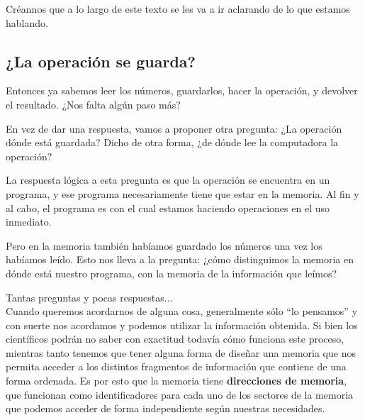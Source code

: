 \documentclass[a4paper, titlepage]{report}
\begin{document}
	Créannos que a lo largo de este texto se les va a ir aclarando de lo que estamos hablando.
	
	\subsection{¿La operación se guarda?}
	
	Entonces ya sabemos leer los números, guardarlos, hacer la operación, y devolver el resultado. ¿Nos falta algún paso más?
	
	En vez de dar una respuesta, vamos a proponer otra pregunta: ¿La operación dónde está guardada? Dicho de otra forma, ¿de dónde lee la computadora la operación?
	
	La respuesta lógica a esta pregunta es que la operación se encuentra en un programa, y ese programa necesariamente tiene que estar en la memoria. Al fin y al cabo, el programa es con el cual estamos haciendo operaciones en el uso inmediato.
	
	Pero en la memoria también habíamos guardado los números una vez los habíamos leído. Esto nos lleva a la pregunta: ¿cómo distinguimos la memoria en dónde está nuestro programa, con la memoria de la información que leímos?
	
	Tantas preguntas y pocas respuestas...\\
	
	Cuando queremos acordarnos de alguna cosa, generalmente sólo ``lo pensamos'' y con suerte nos acordamos y podemos utilizar la información obtenida. Si bien los científicos podrán no saber con exactitud todavía cómo funciona este proceso, mientras tanto tenemos que tener alguna forma de diseñar una memoria que nos permita acceder a los distintos fragmentos de información que contiene de una forma ordenada. Es por esto que la memoria tiene \textbf{direcciones de memoria}, que funcionan como identificadores para cada uno de los sectores de la memoria que podemos acceder de forma independiente según nuestras necesidades. 
	
	
	
	
	
\end{document}
